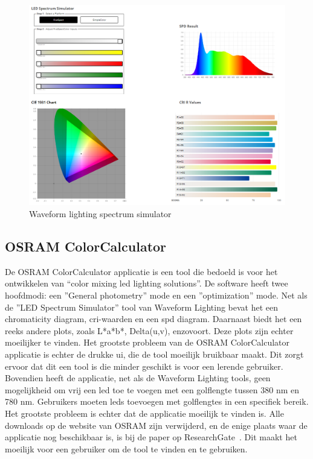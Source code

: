 \begin{figure}[H]
    \centering
    \includegraphics[width=0.95\linewidth]{figs/waveform_spectral.png}
    \caption{Waveform lighting spectrum simulator ~\cite{LEDSpectrumSimulator}}%
    \label{fig:spectrum simulator}
\end{figure}

\subsection{OSRAM ColorCalculator}

De OSRAM ColorCalculator applicatie is een tool die bedoeld is voor het ontwikkelen van ``color mixing \gls{led} lighting solutions''. De software heeft twee hoofdmodi: een ''General photometry'' mode en een ''optimization'' mode. Net als de ''LED Spectrum Simulator'' tool van Waveform Lighting bevat het een chromaticity diagram, \gls{cri}-waarden en een \gls{spd} diagram. Daarnaast biedt het een reeks andere plots, zoals L*a*b*, Delta(u,v), enzovoort. Deze plots zijn echter moeilijker te vinden. Het grootste probleem van de OSRAM ColorCalculator applicatie is echter de drukke \gls{ui}, die de tool moeilijk bruikbaar maakt. Dit zorgt ervoor dat dit een tool is die minder geschikt is voor een lerende gebruiker. Bovendien heeft de applicatie, net als de Waveform Lighting tools, geen mogelijkheid om vrij een \gls{led} toe te voegen met een golflengte tussen 380 nm en 780 nm. Gebruikers moeten \gls{led}s toevoegen met golflengtes in een specifiek bereik. Het grootste probleem is echter dat de applicatie moeilijk te vinden is. Alle downloads op de website van OSRAM zijn verwijderd, en de enige plaats waar de applicatie nog beschikbaar is, is bij de paper op ResearchGate~\cite{selverianColorCalculatorSoftware2017}. Dit maakt het moeilijk voor een gebruiker om de tool te vinden en te gebruiken.

